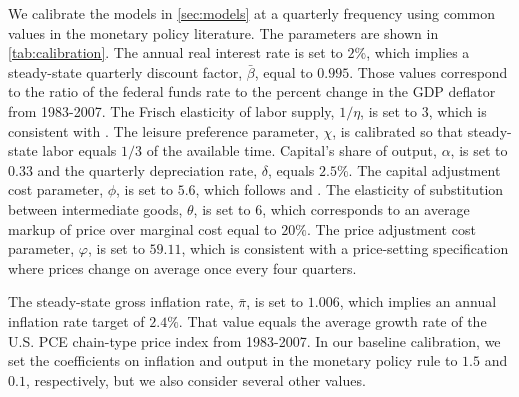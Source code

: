 \documentclass[12pt,final]{article}
\begin{document}
We calibrate the models in \autoref{sec:models} at a quarterly frequency using common values in the monetary policy literature. The parameters are shown in \autoref{tab:calibration}. The annual real interest rate is set to $2\%$, which implies a steady-state quarterly discount factor, $\bar{\beta}$, equal to $0.995$. Those values correspond to the ratio of the federal funds rate to the percent change in the GDP deflator from 1983-2007. The Frisch elasticity of labor supply, $1/\eta$, is set to $3$, which is consistent with \citet{Peterman2012}. The leisure preference parameter, $\chi$, is calibrated so that steady-state labor equals $1/3$ of the available time. Capital's share of output, $\alpha$, is set to $0.33$ and the quarterly depreciation rate, $\delta$, equals $2.5\%$. The capital adjustment cost parameter, $\phi$, is set to $5.6$, which follows \citet{Eberly1997} and \citet{ErcegLevin2003}. The elasticity of substitution between intermediate goods, $\theta$, is set to $6$, which corresponds to an average markup of price over marginal cost equal to $20\%$. The price adjustment cost parameter, $\varphi$, is set to $59.11$, which is consistent with a \citet{Calvo1983} price-setting specification where prices change on average once every four quarters.

The steady-state gross inflation rate, $\bar{\pi}$, is set to $1.006$, which implies an annual inflation rate target of $2.4\%$. That value equals the average growth rate of the U.S. PCE chain-type price index from 1983-2007. In our baseline calibration, we set the coefficients on inflation and output in the monetary policy rule to $1.5$ and $0.1$, respectively, but we also consider several other values.
\end{document}

